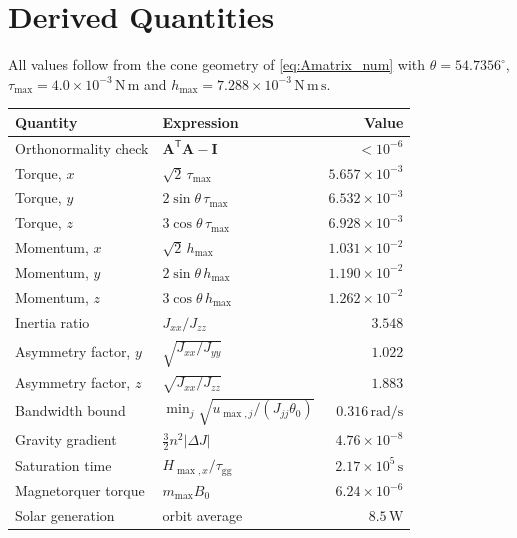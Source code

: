 \documentclass[conference,10pt,a4paper]{IEEEtran}
\newcommand{\mat}[1]{\bm{#1}}
\newcommand{\T}{^{\mathsf{T}}}
\newcommand{\unit}[1]{\ensuremath{\,\mathrm{#1}}}
\begin{document}
\section{Derived Quantities}
\label{app:derived}

All values follow from the cone geometry of \cref{eq:Amatrix_num} with
$\theta=54.7356^\circ$, $\tau_\text{max}=4.0\times10^{-3}\unit{N\,m}$ and
$h_\text{max}=7.288\times10^{-3}\unit{N\,m\,s}$.

\begin{table}[!h]
\centering
\footnotesize
\begin{tabular}{@{}llr@{}}
\toprule
\textbf{Quantity} & \textbf{Expression} & \textbf{Value} \\
\midrule
Orthonormality check & $\mat{A}\T\mat{A}-\mat{I}$        & $<10^{-6}$ \\
Torque, $x$          & $\sqrt{2}\,\tau_\text{max}$        & $5.657{\times}10^{-3}$ \\
Torque, $y$          & $2\sin\theta\,\tau_\text{max}$     & $6.532{\times}10^{-3}$ \\
Torque, $z$          & $3\cos\theta\,\tau_\text{max}$     & $6.928{\times}10^{-3}$ \\
Momentum, $x$        & $\sqrt{2}\,h_\text{max}$           & $1.031{\times}10^{-2}$ \\
Momentum, $y$        & $2\sin\theta\,h_\text{max}$        & $1.190{\times}10^{-2}$ \\
Momentum, $z$        & $3\cos\theta\,h_\text{max}$        & $1.262{\times}10^{-2}$ \\
Inertia ratio        & $J_{xx}/J_{zz}$                    & $3.548$ \\
Asymmetry factor, $y$& $\sqrt{J_{xx}/J_{yy}}$             & $1.022$ \\
Asymmetry factor, $z$& $\sqrt{J_{xx}/J_{zz}}$             & $1.883$ \\
Bandwidth bound      & $\min_j\sqrt{u_{\max,j}/(J_{jj}\theta_0)}$ & $0.316\unit{rad/s}$ \\
Gravity gradient     & $\tfrac{3}{2}n^2|\Delta J|$        & $4.76{\times}10^{-8}$ \\
Saturation time      & $H_{\max,x}/\tau_\text{gg}$        & $2.17{\times}10^{5}\unit{s}$ \\
Magnetorquer torque  & $m_\text{max}B_0$                  & $6.24{\times}10^{-6}$ \\
Solar generation     & orbit average                      & $8.5\unit{W}$ \\
\bottomrule
\end{tabular}
\end{table}
\end{document}
